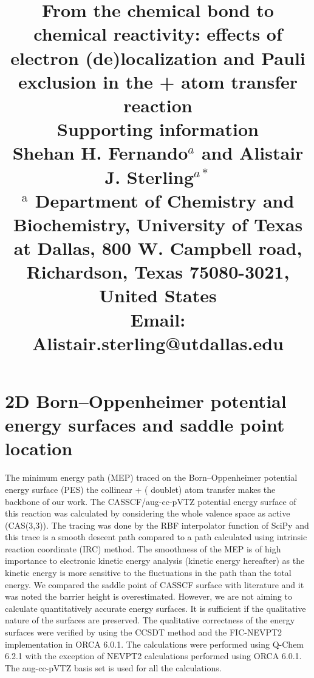 \documentclass[12pt]{scrartcl}
\begin{document}
\title{
\linespread{2.5} \fontsize {18}{8} \selectfont From the chemical bond to chemical reactivity: effects of electron (de)localization and Pauli exclusion in the  +  atom transfer reaction\\[0.2in]
\fontsize {14}{8} \selectfont Supporting information\\[0.25in]
\fontsize {12}{8} \selectfont Shehan H. Fernando$^a$ and Alistair J. Sterling$^{a*}$\\[0.25in]
\fontsize{10}{8} \selectfont $^\text{a}$ Department of Chemistry and Biochemistry, University of Texas at Dallas, 800 W. Campbell road,  Richardson, Texas 75080-3021, United States\\[0.25in]
\fontsize{10}{8} \selectfont Email: Alistair.sterling@utdallas.edu
\date{}
}

\maketitle
{}



\section{2D Born--Oppenheimer potential energy surfaces and saddle point location}

The minimum energy path (MEP) traced on the Born--Oppenheimer potential energy surface (PES) the collinear + ( doublet) atom transfer makes the backbone of our work. The CASSCF/aug-cc-pVTZ potential energy surface of this reaction was calculated by considering the whole valence space as active (CAS(3,3)). The tracing was done by the RBF interpolator function of SciPy\cite{scipy2020} and this trace is a smooth descent path compared to a path calculated using intrinsic reaction coordinate (IRC) method. The smoothness of the MEP is of high importance to electronic kinetic energy analysis (kinetic energy hereafter) as the kinetic energy is more sensitive to the fluctuations in the path than the total energy.\cite{slater1933,lowdin1959} We compared the saddle point of CASSCF surface with literature and it was noted the barrier height is overestimated.\cite{peterson2002} However, we are not aiming to calculate quantitatively accurate energy surfaces. It is sufficient if the qualitative nature of the surfaces are preserved. The qualitative correctness of the energy surfaces were verified by using the CCSDT method and the FIC-NEVPT2 implementation in ORCA 6.0.1\cite{neese2025}. The calculations were performed using Q-Chem 6.2.1\cite{qchem6} with the exception of NEVPT2 calculations performed using ORCA 6.0.1. The aug-cc-pVTZ\cite{dunning1992} basis set is used for all the calculations. 
\end{document}

